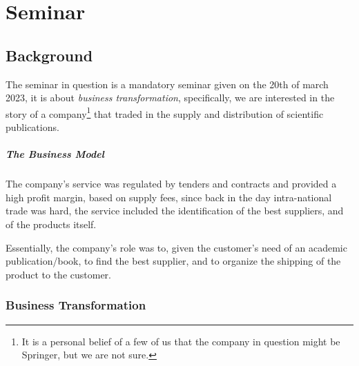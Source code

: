 \documentclass[openright, twoside, twocolumn]{report}
\begin{document}
%


\chapter{Seminar}

\section{Background}

The seminar in question is a mandatory seminar given on the 20th of march 2023, it is about \emph{business transformation},
specifically, we are interested in the story of a company\footnote{
  It is a personal belief of a few of us that the company in question might be Springer, but we are not sure.
} that traded in the supply and distribution of scientific publications.

\paragraph{The Business Model}

The company's service was regulated by tenders and contracts and provided a high profit margin, based on supply fees, since back in the
day intra-national trade was hard, the service included the identification of the best suppliers, and of the
products itself.

Essentially, the company's role was to, given the customer's need of an academic publication/book, to find the best supplier, and to
organize the shipping of the product to the customer.

\subsection{Business Transformation}
\end{document}
